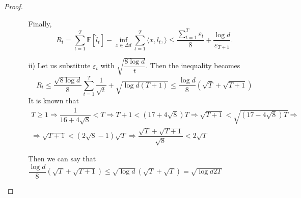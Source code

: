 \documentclass[12pt]{report}
\begin{document}
\begin{proof}
\begin{enumerate}
\begin{itemize}
\[            \]
            Finally, 
            \[
                R_t = \sum\limits_{t=1}^T \mathbb{E}[\hat{l}_t] - \inf\limits_{x \in \Delta d} \sum\limits_{t=1}^{T} \langle x, l_t, \rangle \leq \dfrac{\displaystyle \sum\limits_{t=1}^T \varepsilon_t}{8} + \dfrac{\log d}{\varepsilon_{T+1}}.
            \]
            \item[ii)] 
            Let us substitute $\varepsilon_t$ with $\sqrt{\dfrac{8 \log d}{t}}$. Then the inequality becomes
            \[
                R_t \leq \dfrac{\sqrt{8 \log d}}{8} \sum\limits_{t=1}^{T} \dfrac{1}{\sqrt{t}} + \sqrt{\log d (T + 1)} \leq \dfrac{\log d}{8} (\sqrt{T} + \sqrt{T + 1})
            \]
It is known that 
\[
    \begin{array}{c}
        T \geq 1 \Rightarrow \dfrac{1}{16 + 4 \sqrt{8}} < T \Rightarrow T + 1 < (17 + 4 \sqrt{8})T \Rightarrow \sqrt{T + 1} < \sqrt{(17 - 4 \sqrt{8})T} \Longrightarrow \\[0.5cm] 
        \Rightarrow \sqrt{T + 1} < (2 \sqrt{8} - 1) \sqrt{T} \Rightarrow \dfrac{\sqrt{T} + \sqrt{T + 1}}{\sqrt{8}} < 2 \sqrt{T}
    \end{array}
\]

Then we can say that 
$ \dfrac{\log d}{8} (\sqrt{T} + \sqrt{T + 1}) \leq \sqrt{\log d} (\sqrt{T} + \sqrt{T}) = \sqrt{\log d 2 T}$

        \end{itemize}
    \end{enumerate}
\end{proof}
\end{document}
